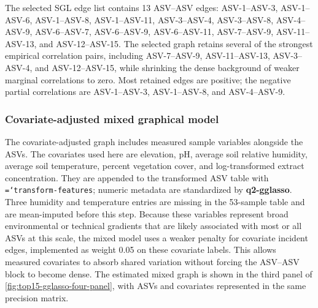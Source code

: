 \documentclass[11pt,a4paper]{article}
\newcommand{\code}[1]{\allowbreak\texttt{\hyphenchar\font=`\-\relax #1}}
\newcommand{\pkg}[1]{\textbf{#1}}
\begin{document}
The selected SGL edge list contains 13 ASV--ASV edges:
ASV-1--ASV-3, ASV-1--ASV-6, ASV-1--ASV-8, ASV-1--ASV-11, ASV-3--ASV-4,
ASV-3--ASV-8, ASV-4--ASV-9, ASV-6--ASV-7, ASV-6--ASV-9, ASV-6--ASV-11,
ASV-7--ASV-9, ASV-11--ASV-13, and ASV-12--ASV-15. The selected graph retains
several of the strongest empirical correlation pairs, including ASV-7--ASV-9,
ASV-11--ASV-13, ASV-3--ASV-4, and ASV-12--ASV-15, while shrinking the dense
background of weaker marginal correlations to zero. Most retained edges are
positive; the negative partial correlations are ASV-1--ASV-3, ASV-1--ASV-8, and
ASV-4--ASV-9.

\subsubsection{Covariate-adjusted mixed graphical model}
\label{sec:lowdim-mixed-graph}

The covariate-adjusted graph includes measured sample variables alongside the
ASVs. The covariates used here are
elevation, pH, average soil relative humidity, average soil temperature, percent
vegetation cover, and log-transformed extract concentration. They are appended
to the transformed ASV table with \code{transform-features}; numeric metadata
are standardized by \pkg{q2-gglasso}. Three humidity and temperature entries are
missing in the 53-sample table and are mean-imputed before this step. Because
these variables represent broad environmental or technical gradients that are
likely associated with most or all ASVs at this scale, the mixed model uses a
weaker penalty for covariate incident edges, implemented as weight 0.05 on these
covariate labels. This allows measured covariates to absorb shared variation
without forcing the ASV--ASV block to become dense. The estimated mixed graph is
shown in the third panel of \autoref{fig:top15-gglasso-four-panel}, with ASVs and
covariates represented in the same precision matrix.
\end{document}
